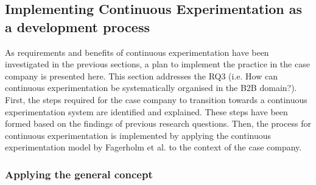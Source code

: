 \documentclass[english, grading]{tktltiki2}
\theoremstyle{definition}
\theoremstyle{remark}
\begin{document}


\subsection{Implementing Continuous Experimentation as a development process}
As requirements and benefits of continuous experimentation have been investigated in the previous sections, a plan to implement the practice in the case company is presented here. This section addresses the RQ3 (i.e. How can continuous experimentation be systematically organised in the B2B domain?). First, the steps required for the case company to transition towards a continuous experimentation system are identified and explained. These steps have been formed based on the findings of previous research questions. Then, the process for continuous experimentation is implemented by applying the continuous experimentation model by Fagerholm et al. \cite{fagerholm2014building} to the context of the case company. 
\subsubsection{Applying the general concept}

\end{document}
